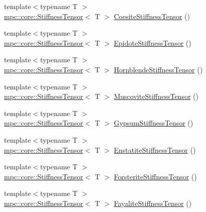 \begin{DoxyCompactItemize}
\item 
{\footnotesize template$<$typename T $>$ }\\\mbox{\hyperlink{structmpc_1_1core_1_1_stiffness_tensor}{mpc\+::core\+::\+Stiffness\+Tensor}}$<$ T $>$ \mbox{\hyperlink{namespacempc_1_1data_a5cbb5cf93c39b009c94e660ccec1cd9a}{Coesite\+Stiffness\+Tensor}} ()
\item 
{\footnotesize template$<$typename T $>$ }\\\mbox{\hyperlink{structmpc_1_1core_1_1_stiffness_tensor}{mpc\+::core\+::\+Stiffness\+Tensor}}$<$ T $>$ \mbox{\hyperlink{namespacempc_1_1data_aabbad6c94ada3a51f642c35209953127}{Epidote\+Stiffness\+Tensor}} ()
\item 
{\footnotesize template$<$typename T $>$ }\\\mbox{\hyperlink{structmpc_1_1core_1_1_stiffness_tensor}{mpc\+::core\+::\+Stiffness\+Tensor}}$<$ T $>$ \mbox{\hyperlink{namespacempc_1_1data_a19442c5f8b73475056c20bea55689213}{Hornblende\+Stiffness\+Tensor}} ()
\item 
{\footnotesize template$<$typename T $>$ }\\\mbox{\hyperlink{structmpc_1_1core_1_1_stiffness_tensor}{mpc\+::core\+::\+Stiffness\+Tensor}}$<$ T $>$ \mbox{\hyperlink{namespacempc_1_1data_a3cdfe643ae316bdfd22f46ab4c9524ee}{Muscovite\+Stiffness\+Tensor}} ()
\item 
{\footnotesize template$<$typename T $>$ }\\\mbox{\hyperlink{structmpc_1_1core_1_1_stiffness_tensor}{mpc\+::core\+::\+Stiffness\+Tensor}}$<$ T $>$ \mbox{\hyperlink{namespacempc_1_1data_a5d935d5bdfff2b3b23a6089c3bf0a5f7}{Gypsum\+Stiffness\+Tensor}} ()
\item 
{\footnotesize template$<$typename T $>$ }\\\mbox{\hyperlink{structmpc_1_1core_1_1_stiffness_tensor}{mpc\+::core\+::\+Stiffness\+Tensor}}$<$ T $>$ \mbox{\hyperlink{namespacempc_1_1data_a4051f002105bbe1972265c3d1c30773c}{Enstatite\+Stiffness\+Tensor}} ()
\item 
{\footnotesize template$<$typename T $>$ }\\\mbox{\hyperlink{structmpc_1_1core_1_1_stiffness_tensor}{mpc\+::core\+::\+Stiffness\+Tensor}}$<$ T $>$ \mbox{\hyperlink{namespacempc_1_1data_a4fcc4a43ee16dbdd1fe91ac16fd740ab}{Forsterite\+Stiffness\+Tensor}} ()
\item 
{\footnotesize template$<$typename T $>$ }\\\mbox{\hyperlink{structmpc_1_1core_1_1_stiffness_tensor}{mpc\+::core\+::\+Stiffness\+Tensor}}$<$ T $>$ \mbox{\hyperlink{namespacempc_1_1data_a376bcd58bd7cbedd5496301ba2872b46}{Fayalite\+Stiffness\+Tensor}} ()

\end{DoxyCompactItemize}
